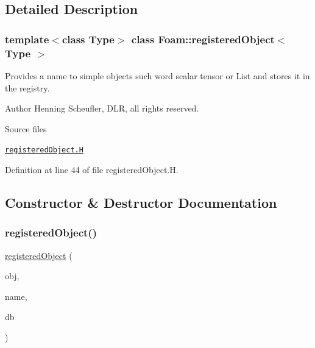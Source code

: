 \subsection{Detailed Description}
\subsubsection*{template$<$class Type$>$\newline
class Foam\+::registered\+Object$<$ Type $>$}

Provides a name to simple objects such word scalar tensor or List and stores it in the registry. 

\label{_Description}%
 Author Henning Scheufler, D\+LR, all rights reserved.

\begin{DoxyParagraph}{Source files}

\begin{DoxyItemize}
\item \href{../../../home/carlo/data/GeN-Foam/GeN-Foam_ffn/GeN-Foam/GeN-Foam/FMU4FOAM/ECI4FOAM/src/externalComm/dataInterface/registeredObject.H}{\tt registered\+Object.\+H} 
\end{DoxyItemize}
\end{DoxyParagraph}


Definition at line 44 of file registered\+Object.\+H.



\subsection{Constructor \& Destructor Documentation}
\mbox{\label{classFoam_1_1registeredObject_ac8af0c08d8721e8a44d4368844932347}} 
\subsubsection{\texorpdfstring{registered\+Object()}{registeredObject()}\hspace{0.1cm}{\footnotesize\ttfamily [1/2]}}
{\footnotesize\ttfamily \hyperlink{classFoam_1_1registeredObject}{registered\+Object} (\begin{DoxyParamCaption}\item[{const Type \&}]{obj,  }\item[{const word}]{name,  }\item[{const object\+Registry \&}]{db }\end{DoxyParamCaption})}



